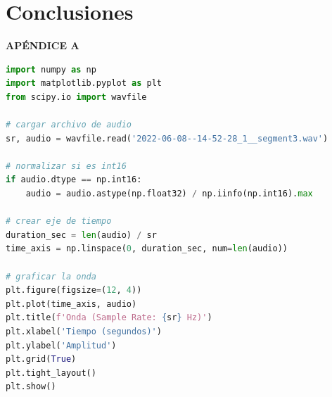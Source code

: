 \documentclass[12pt]{report}
\begin{document}
\section{Conclusiones}





\pagebreak
{}
\printbibliography
\thispagestyle{empty}


\pagebreak
{}
\begin{center}
\large\textbf{APÉNDICE A}
\end{center}

\begin{lstlisting}[language=Python, caption={Visualización de la forma de onda de un archivo de audio.}, label={lst:waveform}]
import numpy as np
import matplotlib.pyplot as plt
from scipy.io import wavfile

# cargar archivo de audio
sr, audio = wavfile.read('2022-06-08--14-52-28_1__segment3.wav')

# normalizar si es int16
if audio.dtype == np.int16:
    audio = audio.astype(np.float32) / np.iinfo(np.int16).max

# crear eje de tiempo
duration_sec = len(audio) / sr
time_axis = np.linspace(0, duration_sec, num=len(audio))

# graficar la onda
plt.figure(figsize=(12, 4))
plt.plot(time_axis, audio)
plt.title(f'Onda (Sample Rate: {sr} Hz)')
plt.xlabel('Tiempo (segundos)')
plt.ylabel('Amplitud')
plt.grid(True)
plt.tight_layout()
plt.show()

\end{lstlisting}
\end{document}
